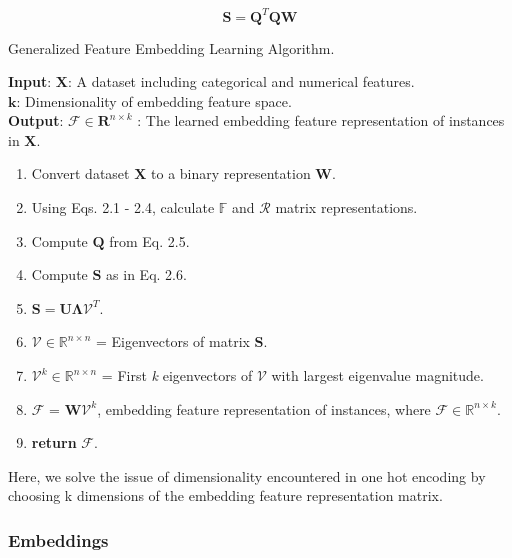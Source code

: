 \documentclass{article}
\begin{document}
\begin{equation}
    \mathbf{S} = \mathbf{Q}^T \mathbf{Q} \mathbf{W}
\end{equation}

\begin{algorithm}[htbp]
\caption{Generalized Feature Embedding Learning Algorithm.~\cite{gel}}
\label{alg:gel}
\textbf{Input}: $\mathbf{X}$: A dataset including categorical and numerical features.\\
                $\mathbf{k}$: Dimensionality of embedding feature space.\\
\textbf{Output}: $\mathcal{F} \in \mathbf{R}^{n \times k}$ : The learned embedding feature representation of instances in $\mathbf{X}$.

\begin{enumerate}
    \item Convert dataset $\mathbf{X}$ to a binary representation $\mathbf{W}$.
    \item Using Eqs. 2.1 - 2.4, calculate $\mathbb{F}$ and $\mathcal{R}$ matrix representations.
    \item Compute $\mathbf{Q}$ from Eq. 2.5.
    \item Compute $\mathbf{S}$ as in Eq. 2.6.
    \item $\mathbf{S} = \mathbf{U\Lambda}\mathcal{V}^T$.
    \item $\mathcal{V} \in \mathbb{R}^{n \times n}$ =  Eigenvectors of matrix $\mathbf{S}$.
    \item $\mathcal{V}^k \in \mathbb{R}^{n \times n}$ = First \textit{k} eigenvectors of $\mathcal{V}$ with largest eigenvalue magnitude.
    \item $\mathcal{F}$ = $\mathbf{W}\mathcal{V}^k$, embedding feature representation of instances, where $\mathcal{F} \in \mathbb{R}^{n \times k}$. 
    \item \textbf{return} $\mathcal{F}$.
\end{enumerate}

\end{algorithm}

Here, we solve the issue of dimensionality encountered in one hot encoding by choosing k dimensions of the embedding feature representation matrix. 

\subsubsection{Embeddings}
\end{document}
